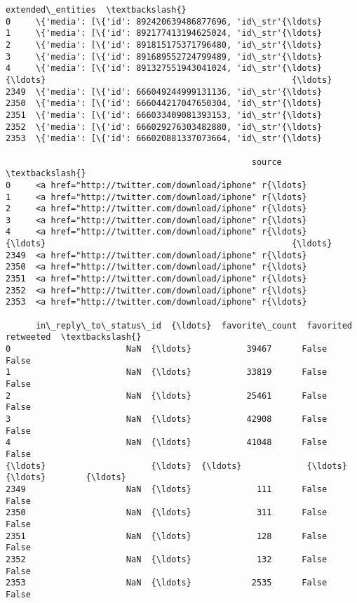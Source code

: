 \documentclass[11pt]{article}
\begin{document}
\begin{tcolorbox}[breakable, size=fbox, boxrule=.5pt, pad at break*=1mm, opacityfill=0]
\begin{Verbatim}[commandchars=\\\{\}]
                                      extended\_entities  \textbackslash{}
0     \{'media': [\{'id': 892420639486877696, 'id\_str'{\ldots}
1     \{'media': [\{'id': 892177413194625024, 'id\_str'{\ldots}
2     \{'media': [\{'id': 891815175371796480, 'id\_str'{\ldots}
3     \{'media': [\{'id': 891689552724799489, 'id\_str'{\ldots}
4     \{'media': [\{'id': 891327551943041024, 'id\_str'{\ldots}
{\ldots}                                                 {\ldots}
2349  \{'media': [\{'id': 666049244999131136, 'id\_str'{\ldots}
2350  \{'media': [\{'id': 666044217047650304, 'id\_str'{\ldots}
2351  \{'media': [\{'id': 666033409081393153, 'id\_str'{\ldots}
2352  \{'media': [\{'id': 666029276303482880, 'id\_str'{\ldots}
2353  \{'media': [\{'id': 666020881337073664, 'id\_str'{\ldots}

                                                 source  \textbackslash{}
0     <a href="http://twitter.com/download/iphone" r{\ldots}
1     <a href="http://twitter.com/download/iphone" r{\ldots}
2     <a href="http://twitter.com/download/iphone" r{\ldots}
3     <a href="http://twitter.com/download/iphone" r{\ldots}
4     <a href="http://twitter.com/download/iphone" r{\ldots}
{\ldots}                                                 {\ldots}
2349  <a href="http://twitter.com/download/iphone" r{\ldots}
2350  <a href="http://twitter.com/download/iphone" r{\ldots}
2351  <a href="http://twitter.com/download/iphone" r{\ldots}
2352  <a href="http://twitter.com/download/iphone" r{\ldots}
2353  <a href="http://twitter.com/download/iphone" r{\ldots}

      in\_reply\_to\_status\_id  {\ldots}  favorite\_count  favorited  retweeted  \textbackslash{}
0                       NaN  {\ldots}           39467      False      False
1                       NaN  {\ldots}           33819      False      False
2                       NaN  {\ldots}           25461      False      False
3                       NaN  {\ldots}           42908      False      False
4                       NaN  {\ldots}           41048      False      False
{\ldots}                     {\ldots}  {\ldots}             {\ldots}        {\ldots}        {\ldots}
2349                    NaN  {\ldots}             111      False      False
2350                    NaN  {\ldots}             311      False      False
2351                    NaN  {\ldots}             128      False      False
2352                    NaN  {\ldots}             132      False      False
2353                    NaN  {\ldots}            2535      False      False


\end{Verbatim}
\end{tcolorbox}
\end{document}
